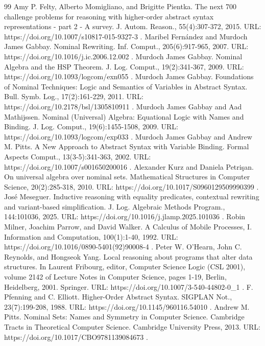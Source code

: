 \documentclass[10pt,a4paper]{amsart}
\begin{document}
\begin{thebibliography}{99}
 Amy P. Felty, Alberto Momigliano, and Brigitte Pientka. The next 700 challenge problems for reasoning with higher-order abstract syntax representations - part 2 - A survey. J. Autom. Reason., 55(4):307-372, 2015. URL: https://doi.org/10.1007/s10817-015-9327-3 .
 Maribel Fernández and Murdoch James Gabbay. Nominal Rewriting. Inf. Comput., 205(6):917-965, 2007. URL: https://doi.org/10.1016/j.ic.2006.12.002 .
 Murdoch James Gabbay. Nominal Algebra and the HSP Theorem. J. Log. Comput., 19(2):341-367, 2009. URL: https://doi.org/10.1093/logcom/exn055 .
 Murdoch James Gabbay. Foundations of Nominal Techniques: Logic and Semantics of Variables in Abstract Syntax. Bull. Symb. Log., 17(2):161-229, 2011. URL: https://doi.org/10.2178/bsl/1305810911 .
 Murdoch James Gabbay and Aad Mathijssen. Nominal (Universal) Algebra: Equational Logic with Names and Binding. J. Log. Comput., 19(6):1455-1508, 2009. URL: https://doi.org/10.1093/logcom/exp033 .
 Murdoch James Gabbay and Andrew M. Pitts. A New Approach to Abstract Syntax with Variable Binding. Formal Aspects Comput., 13(3-5):341-363, 2002. URL: https://doi.org/10.1007/s001650200016 .
 Alexander Kurz and Daniela Petrişan. On universal algebra over nominal sets. Mathematical Structures in Computer Science, 20(2):285-318, 2010. URL: https://doi.org/10.1017/S0960129509990399 .
 José Meseguer. Inductive reasoning with equality predicates, contextual rewriting and variant-based simplification. J. Log. Algebraic Methods Program., 144:101036, 2025. URL: https://doi.org/10.1016/j.jlamp.2025.101036 .
 Robin Milner, Joachim Parrow, and David Walker. A Calculus of Mobile Processes, I. Information and Computation, 100(1):1-40, 1992. URL: https://doi.org/10.1016/0890-5401(92)90008-4 .
 Peter W. O'Hearn, John C. Reynolds, and Hongseok Yang. Local reasoning about programs that alter data structures. In Laurent Fribourg, editor, Computer Science Logic (CSL 2001), volume 2142 of Lecture Notes in Computer Science, pages 1-19, Berlin, Heidelberg, 2001. Springer. URL: https://doi.org/10.1007/3-540-44802-0\_1 .
 F. Pfenning and C. Elliott. Higher-Order Abstract Syntax. SIGPLAN Not., 23(7):199-208, 1988. URL: https://doi.org/10.1145/960116.54010 .
 Andrew M. Pitts. Nominal Sets: Names and Symmetry in Computer Science. Cambridge Tracts in Theoretical Computer Science. Cambridge University Press, 2013. URL: https://doi.org/10.1017/CBO9781139084673 .

\end{thebibliography}
\end{document}
